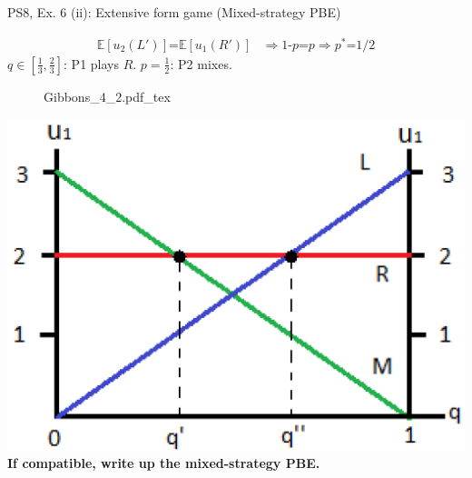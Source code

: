 \begin{frame}{PS8, Ex. 6 (ii): Extensive form game (Mixed-strategy PBE)}
\begin{multicols}{2}
      \begin{align*}
        \mathbb{E}[u_2(L')]\text{=}\mathbb{E}[u_1(R')]&\Rightarrow \text{1-}p\text{=}p\Rightarrow p^*\text{=}1/2
      \end{align*}
      $q\in$$\left[\frac{1}{3},\frac{2}{3}\right]$: P1 plays $R$. $p=\frac{1}{2}$: P2 mixes.
      \vfill\null\columnbreak
      \begin{figure}[!h]
        \center {}
        {Gibbons_4_2.pdf_tex}
      \end{figure}
      \includegraphics[width=1.1\columnwidth]{figures/Gibbons_4_2_E[u]}
      \textbf{If compatible, write up the mixed-strategy PBE.}
      \vfill\null
    \end{multicols}
\end{frame}

